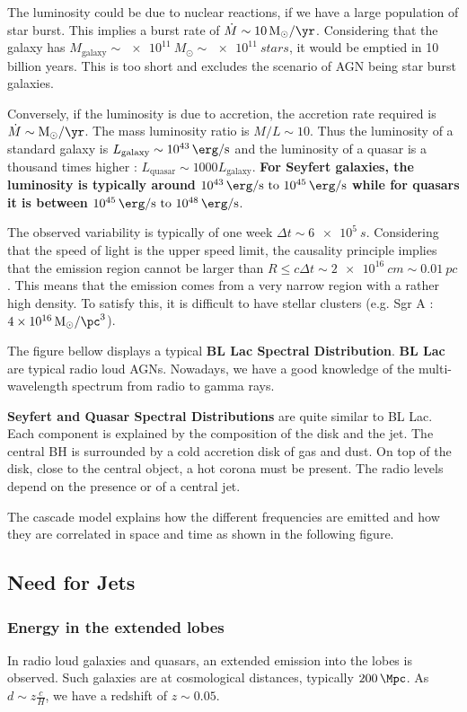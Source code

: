 \documentclass[10pt,a4paper,english]{article}
\begin{document}
The luminosity could be due to nuclear reactions, if we have a large
population of star burst. This implies a burst rate of
$\dot{M} \sim \SI{10}{M_\odot\per\yr}$. Considering that the galaxy
has $M_\mathrm{galaxy} \sim \SI{e11}{M_\odot} \sim \SI{e11}{stars}$,
it would be emptied in 10 billion years. This is too short and
excludes the scenario of AGN being star burst galaxies.

Conversely, if the luminosity is due to accretion, the accretion rate
required is $\dot{M} \sim \si{M_\odot\per\yr}$. The mass luminosity
ratio is $M/L \sim 10$. Thus the luminosity of a standard galaxy is
$L_\mathrm{galaxy} \sim \SI{e43}{\erg\per\s}$ and the luminosity of a
quasar is a thousand times higher :
$L_\mathrm{quasar}\sim 1000 L_\mathrm{galaxy}$. \textbf{For Seyfert
  galaxies, the luminosity is typically around
  $\SIrange{e43}{e45}{\erg\per\s}$ while for quasars it is between
  $\SIrange{e45}{e48}{\erg\per\s}$}.

The observed variability is typically of one week
$\Delta t \sim \SI{6e5}{s}$. Considering that the speed of light is
the upper speed limit, the causality principle implies that the
emission region cannot be larger than
$R \leq c\Delta t \sim \SI{2e16}{cm} \sim \SI{0.01}{pc}$. This means
that the emission comes from a very narrow region with a rather high
density. To satisfy this, it is difficult to have stellar clusters
(e.g. Sgr A : $\SI{4e16}{M_\odot\per\pc^3}$).

The figure bellow  displays a typical
\textbf{BL Lac Spectral Distribution}. \textbf{BL Lac} are typical
radio loud AGNs. Nowadays, we have a good knowledge of the
multi-wavelength spectrum from radio to gamma rays.

\textbf{Seyfert and Quasar Spectral Distributions} are quite similar
to BL Lac. Each component is explained by the composition of the disk
and the jet. The central BH is surrounded by a cold accretion disk of
gas and dust. On top of the disk, close to the central object, a hot
corona must be present. The radio levels depend on the presence or of
a central jet.  

The cascade model explains how the different frequencies are emitted
and how they are correlated in space and time as shown in the
following figure.  
\subsection{Need for Jets}
\subsubsection{Energy in the extended lobes}
In radio loud galaxies and quasars, an extended emission into the
lobes is observed. Such galaxies are at cosmological distances,
typically $\SI{200}{\Mpc}$. As $d\sim z\frac{c }{H}$, we have a
redshift of $z\sim 0.05$.
\end{document}
